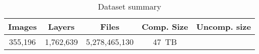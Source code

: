 
\begin{table}
	\scriptsize
	\caption{Dataset summary} \label{tab-dataset-summary}
	\begin{tabular}{|c|c|c|c|c|}%
		\hline
		Images & Layers & Files & Comp. Size &  Uncomp. size\\
		\hline
		355,196               & 1,762,639             & 5,278,465,130  & 47~TB & \VT{}\\
		\hline
	\end{tabular}
\end{table}


